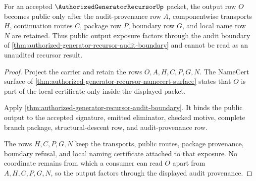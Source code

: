 \begin{theorem}
\label{thm:authorized-generator-recursor-audit-provenance-factorization}
For an accepted $\AuthorizedGeneratorRecursorUp$ packet, the output row $O$ becomes public only after the audit-provenance row $A$, componentwise transports $H$, continuation routes $C$, package row $P$, boundary row $G$, and local name row $N$ are retained. Thus public output exposure factors through the audit boundary of \autoref{thm:authorized-generator-recursor-audit-boundary} and cannot be read as an unaudited recursor result.
\end{theorem}
\begin{proof}
Project the carrier and retain the rows $O,A,H,C,P,G,N$. The NameCert surface of \autoref{thm:authorized-generator-recursor-namecert-surface} states that $O$ is part of the local certificate only inside the displayed packet.

Apply \autoref{thm:authorized-generator-recursor-audit-boundary}. It binds the public output to the accepted signature, emitted eliminator, checked motive, complete branch package, structural-descent row, and audit-provenance row.

The rows $H,C,P,G,N$ keep the transports, public routes, package provenance, boundary refusal, and local naming certificate attached to that exposure. No coordinate remains from which a consumer can read $O$ apart from $A,H,C,P,G,N$, so the output factors through the displayed audit provenance.
\end{proof}

